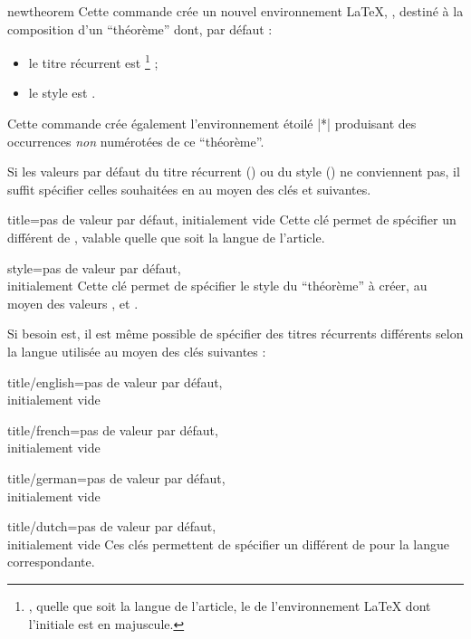 \documentclass[french,nolocaltoc]{nwejmart}
\newtheorem[title=Fait,style=definition]{fact}
\begin{document}
\begin{docCommand}{newtheorem}{}
  Cette commande crée un nouvel environnement \LaTeX{}, , destiné à la
  composition d'un \enquote{théorème} dont, par défaut :
  \begin{itemize}
  \item le titre récurrent est \footnote{\Ie*{}, quelle que soit la
      langue de l'article, le  de l'environnement \LaTeX{} dont
      l'initiale est en majuscule.} ;
  \item le style est .
  \end{itemize}
  Cette commande crée également l'environnement étoilé |*| produisant
  des occurrences \emph{non} numérotées de ce \enquote{théorème}.

  Si les valeurs par défaut du titre récurrent () ou du style
  () ne conviennent pas, il suffit spécifier celles souhaitées
  en  au moyen des clés  et 
  suivantes.
  \begin{docKey}{title}{={}}{pas de
      valeur par défaut, initialement vide}
    Cette clé permet de spécifier un  différent de
    , valable quelle que soit la langue de l'article.
  \end{docKey}
  \begin{docKey}{style}{=\textbar{}\textbar{}}{pas
      de valeur par défaut,\\initialement {}}
    Cette clé permet de spécifier le style du \enquote{théorème} à créer, au
    moyen des valeurs ,  et
    .
  \end{docKey}

  Si besoin est, il est même possible de spécifier des titres récurrents
  différents selon la langue utilisée au moyen des clés suivantes :
  \begin{docKey}{title/english}{={}}{pas de
      valeur par défaut,\\initialement vide}
  \end{docKey}
  \begin{docKey}{title/french}{={}}{pas de
      valeur par défaut,\\initialement vide}
  \end{docKey}
  \begin{docKey}{title/german}{={}}{pas de
      valeur par défaut,\\initialement vide}
  \end{docKey}
  \begin{docKey}{title/dutch}{={}}{pas de
      valeur par défaut,\\initialement vide}
    Ces clés permettent de spécifier un  différent
    de  pour la langue correspondante.
  \end{docKey}


\end{docCommand}
\end{document}
